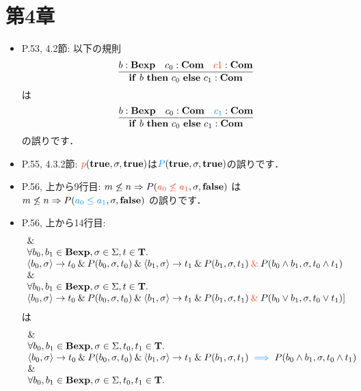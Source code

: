 \documentclass[12pt,titlepage,twoside,openright,dvipdfmx]{jsbook}
\newcommand\old[1]{%
  \textcolor[rgb]{1.0,0.25,0.1}{#1}%
  }
\newcommand\new[1]{%
  \textcolor[rgb]{0,0.55,1.0}{#1}%
  }
\theoremstyle{definition}
\begin{document}
\section*{第4章}

\begin{itemize}
  \item P.53, 4.2節: 以下の規則
  \[
    \infer
    {\mathbf{if}\ b\ \mathbf{then}\ c_0\ \mathbf{else}\ c_1:\mathbf{Com}}
    {b:\mathbf{Bexp} & c_0:\mathbf{Com} & \old{c1}:\mathbf{Com}}
  \]
  は
  \[
    \infer
    {\mathbf{if}\ b\ \mathbf{then}\ c_0\ \mathbf{else}\ c_1:\mathbf{Com}}
    {b:\mathbf{Bexp} & c_0:\mathbf{Com} & \new{c_1}:\mathbf{Com}}
  \]
  の誤りです．
\item P.55, 4.3.2節: $\old{p}(\Ttrue, \sigma,\Ttrue)$は$\new{P}(\Ttrue, \sigma, \Ttrue)$の誤りです．
\item P.56, 上から9行目:
  $m \not\le n \Rightarrow P(\old{a_0 \not\le a_1},\sigma,\mathbf{false})$
  は
  $m \not\le n \Rightarrow P(\new{a_0 \le a_1},\sigma,\mathbf{false})$
  の誤りです．
\item P.56, 上から14行目:
  \[
    \begin{array}{ll}
    \AND\\
    \forall{b_0,b_1\in\mathbf{Bexp},\sigma\in\Sigma,t\in\mathbf{T}}.\\
      \tuple{b_0,\sigma}\rightarrow t_0 \AND P(b_0,\sigma,t_0) \AND \tuple{b_1,\sigma}\rightarrow t_1 \AND P(b_1,\sigma,t_1) \old{{}\AND{}} P(b_0\wedge b_1,\sigma, t_0\wedge t_1)\\
      \AND\\
      \forall{b_0,b_1\in\mathbf{Bexp},\sigma\in\Sigma,t\in\mathbf{T}}.\\
      \tuple{b_0,\sigma}\rightarrow t_0 \AND P(b_0,\sigma,t_0) \AND \tuple{b_1,\sigma}\rightarrow t_1 \AND P(b_1,\sigma,t_1) \old{{}\AND{}} P(b_0\vee b_1,\sigma, t_0\vee t_1) \rbrack
    \end{array}
  \]
  は
  \[
    \begin{array}{ll}
    \AND\\
      \forall{b_0,b_1\in\mathbf{Bexp},\sigma\in\Sigma,t_0,t_1\in\mathbf{T}}.\\
      \tuple{b_0,\sigma}\rightarrow t_0 \AND P(b_0,\sigma,t_0) \AND \tuple{b_1,\sigma}\rightarrow t_1 \AND P(b_1,\sigma,t_1) \new{{}\implies{}} P(b_0\wedge b_1,\sigma, t_0\wedge t_1)\\
      \AND\\
      \forall{b_0,b_1\in\mathbf{Bexp},\sigma\in\Sigma,t_0,t_1\in\mathbf{T}}.\\

\end{array}\]
\end{itemize}
\end{document}
